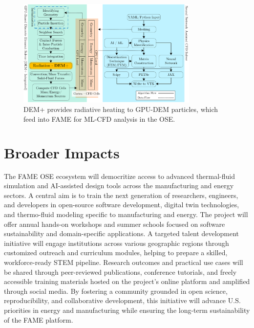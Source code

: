 \documentclass[11pt]{article}
\begin{document}
\begin{figure}[h]
\centering
\includegraphics[width=0.8\textwidth]{figures/Flowchart.pdf}
\caption{DEM+ provides radiative heating to GPU-DEM particles, which feed into FAME for ML-CFD analysis in the OSE.}
\label{fig:integration}
\end{figure}

\section*{Broader Impacts}
\vspace{-3pt}
\noindent
The FAME OSE ecosystem will democritize access to advanced thermal-fluid simulation and AI-assisted design tools across the manufacturing and energy sectors. A central aim is to train the next generation of researchers, engineers, and developers in open-source software development, digital twin technologies, and thermo-fluid modeling specific to manufacturing and energy. The project will offer annual hands-on workshops and summer schools focused on software sustainability and domain-specific applications. A targeted talent development initiative will engage institutions across various geographic regions through customized outreach and curriculum modules, helping to prepare a skilled, workforce-ready STEM pipeline. Research outcomes and practical use cases will be shared through peer-reviewed publications, conference tutorials, and freely accessible training materials hosted on the project's online platform and amplified through social media. By fostering a community grounded in open science, reproducibility, and collaborative development, this initiative will advance U.S. priorities in energy and manufacturing while ensuring the long-term sustainability of the FAME platform.
\end{document}
